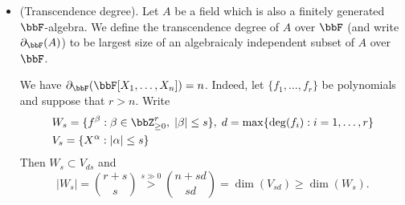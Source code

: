 \begin{itemize}
\begin{example}
    Let $H_f = V(f)$, $f$ irreducible, then 
    \begin{equation}
        \begin{split}
            \dim(H_f) & = \deg\upleft{a}\text{HP}_{I(H_f)}(t)\\
            &=\deg \upleft{a}\text{HP}_{(f)}(t)\\
            &=\deg (\frac{\deg(f)}{(n-1)!}t^{n-1}+\cdots)\\
            &=n-1.
        \end{split}
    \end{equation}
\end{example}
The dimension has the expected property: If $W\subset V$ is closed, then $\dim(W)\leq\dim(V)$. In fact
\begin{equation}
    \begin{split}
        &I(V)\subset I(W)\Rightarrow\\
        &I(V)_{\leq s}\subset I(W)_{\leq s}\Rightarrow \\
        &\upleft{a}\text{HF}_{I(W)}(s) \leq \upleft{a}\text{HF}_{I(V)}(s),\;\forall s\geq0\Rightarrow\\
        &\deg \upleft{a}\text{HF}_{I(W)}(t)\leq \deg \upleft{a}\text{HF}_{I(V)}(t).
    \end{split}
\end{equation}
\item(Transcendence degree). Let $A$ be a field which is also a finitely generated $\bbF$-algebra. We define 
the transcendence degree of $A$ over $\bbF$ (and write $\partial_{\bbF}(A)$) to be largest size of an algebraicaly independent subset of $A$ over 
$\bbF$. 
\begin{example}
    We have $\partial_{\bbF}(\bbF[X_1,\dots, X_n])=n$. Indeed, let $\{f_1,\dots, f_r\}$ be polynomials and
    suppose that $r>n$. 
    Write 
    \begin{equation}
        \begin{split}
            &W_s = \{f^\beta:\beta\in\bbZ_{\geq0}^r,\;|\beta|\leq s\},\;d=\max\{\deg(f_i):i=1,\dots,r\}\\
            &V_s=\{X^\alpha:|\alpha|\leq s\}
        \end{split}
    \end{equation}
    Then $W_s\subset V_{ds}$ and 
    \begin{equation}
        |W_s| = \binom{r+s}{s} \overset{s\gg0}{>}\binom{n+sd}{sd} = \dim(V_{sd})\geq \dim(W_s).
    \end{equation}

\end{example}
\end{itemize}
